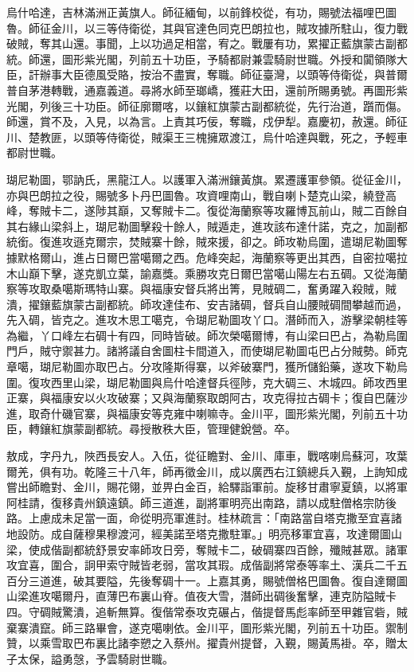 \begin{pinyinscope}
烏什哈達，吉林滿洲正黃旗人。師征緬甸，以前鋒校從，有功，賜號法福哩巴圖魯。師征金川，以三等侍衛從，其與官達色同克巴朗拉也，賊攻據所駐山，復力戰破賊，奪其山還。事聞，上以功過足相當，宥之。戰屢有功，累擢正藍旗蒙古副都統。師還，圖形紫光閣，列前五十功臣，予騎都尉兼雲騎尉世職。外授和闐領隊大臣，訐辦事大臣德風受賂，按治不盡實，奪職。師征臺灣，以頭等侍衛從，與普爾普自茅港轉戰，通嘉義道。尋將水師至瑯嶠，獲莊大田，還前所賜勇號。再圖形紫光閣，列後三十功臣。師征廓爾喀，以鑲紅旗蒙古副都統從，先行治道，躓而傷。師還，賞不及，入見，以為言。上責其巧佞，奪職，戍伊犁。嘉慶初，赦還。師征川、楚教匪，以頭等侍衛從，賊渠王三槐擁眾渡江，烏什哈達與戰，死之，予輕車都尉世職。

瑚尼勒圖，鄂訥氏，黑龍江人。以護軍入滿洲鑲黃旗。累遷護軍參領。從征金川，亦與巴朗拉之役，賜號多卜丹巴圖魯。攻資哩南山，戰自喇卜楚克山梁，繞登高峰，奪賊卡二，遂陟其巔，又奪賊卡二。復從海蘭察等攻羅博瓦前山，賊二百餘自其右緣山梁斜上，瑚尼勒圖擊殺十餘人，賊遁走，進攻該布達什諾，克之，加副都統銜。復進攻遜克爾宗，焚賊寨十餘，賊來援，卻之。師攻勒烏圍，遣瑚尼勒圖奪據默格爾山，進占日爾巴當噶爾之西。危峰突起，海蘭察等更出其西，自密拉噶拉木山巔下擊，遂克凱立葉，諭嘉獎。乘勝攻克日爾巴當噶山陽左右五碉。又從海蘭察等攻取桑噶斯瑪特山寨。與福康安督兵將出箐，見賊碉二，奮勇躍入殺賊，賊潰，擢鑲藍旗蒙古副都統。師攻達佳布、安吉諸碉，督兵自山腰賊碉間攀越而過，先入碉，皆克之。進攻木思工噶克，令瑚尼勒圖攻丫口。潛師而入，游擊梁朝桂等為繼，丫口峰左右碉十有四，同時皆破。師次榮噶爾博，有山梁曰巴占，為勒烏圍門戶，賊守禦甚力。諸將議自舍圖柱卡間道入，而使瑚尼勒圖屯巴占分賊勢。師克章噶，瑚尼勒圖亦取巴占。分攻隆斯得寨，以斧破寨門，獲所儲鉛藥，遂攻下勒烏圍。復攻西里山梁，瑚尼勒圖與烏什哈達督兵徑陟，克大碉三、木城四。師攻西里正寨，與福康安以火攻破寨；又與海蘭察取朗阿古，攻克得拉古碉卡；復自巴薩沙進，取奇什磯官寨，與福康安等克雍中喇嘛寺。金川平，圖形紫光閣，列前五十功臣，轉鑲紅旗蒙副都統。尋授散秩大臣，管理健銳營。卒。

敖成，字丹九，陜西長安人。入伍，從征瞻對、金川、庫車，戰喀喇烏蘇河，攻葉爾羌，俱有功。乾隆三十八年，師再徵金川，成以廣西右江鎮總兵入覲，上詢知成嘗出師瞻對、金川，賜花翎，並畀白金百，給驛詣軍前。旋移甘肅寧夏鎮，以將軍阿桂請，復移貴州鎮遠鎮。師三道進，副將軍明亮出南路，請以成駐僧格宗防後路。上慮成未足當一面，命從明亮軍進討。桂林疏言：「南路當自塔克撒至宜喜諸地設防。成自薩穆果穆渡河，經美諾至塔克撒駐軍。」明亮移軍宜喜，攻達爾圖山梁，使成偕副都統舒景安率師攻日旁，奪賊卡二，破碉寨四百餘，殲賊甚眾。諸軍攻宜喜，圍合，詗甲索守賊皆老弱，當攻其瑕。成偕副將常泰等率土、漢兵二千五百分三道進，破其要隘，先後奪碉十一。上嘉其勇，賜號僧格巴圖魯。復自達爾圖山梁進攻噶爾丹，直薄巴布裏山脊。值夜大雪，潛師出碉後奮擊，連克防隘賊卡四。守碉賊驚潰，追斬無算。復偕常泰攻克碾占，偕提督馬彪率師至甲雜官砦，賊棄寨潰竄。師三路畢會，遂克噶喇依。金川平，圖形紫光閣，列前五十功臣。禦制贊，以乘雪取巴布裏比諸李愬之入蔡州。擢貴州提督，入覲，賜黃馬褂。卒，贈太子太保，謚勇愨，予雲騎尉世職。


\end{pinyinscope}
